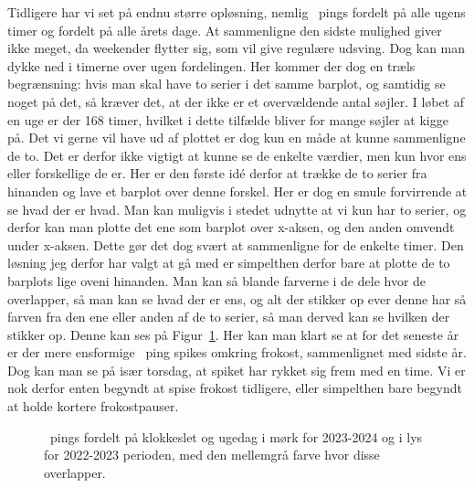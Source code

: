 \documentclass{article}
\newlength\myheight
\newlength\mydepth
\newcommand*\inlinegraphics[1]{%
  \settototalheight\myheight{Xygp}%
  \settodepth\mydepth{Xygp}%
  \raisebox{-\mydepth}{\texttt{[image: \#1]}}%
}
\newcommand{\coffee}[0]{\inlinegraphics{coffee.png}}
\begin{document}
Tidligere har vi set på endnu større opløsning, nemlig \coffee\ pings fordelt på alle ugens timer og fordelt på alle årets dage. At sammenligne den sidste mulighed giver ikke meget, da weekender flytter sig, som vil give regulære udsving. Dog kan man dykke ned i timerne over ugen fordelingen.
Her kommer der dog en træls begrænsning: hvis man skal have to serier i det samme barplot, og samtidig se noget på det, så kræver det, at der ikke er et overvældende antal søjler. I løbet af en uge er der 168 timer, hvilket i dette tilfælde bliver for mange søjler at kigge på.
Det vi gerne vil have ud af plottet er dog kun en måde at kunne sammenligne de to. Det er derfor ikke vigtigt at kunne se de enkelte værdier, men kun hvor ens eller forskellige de er. Her er den første idé derfor at trække de to serier fra hinanden og lave et barplot over denne forskel. Her er dog en smule forvirrende at se hvad der er hvad. Man kan muligvis i stedet udnytte at vi kun har to serier, og derfor kan man plotte det ene som barplot over x-aksen, og den anden omvendt under x-aksen. Dette gør det dog svært at sammenligne for de enkelte timer. Den løsning jeg derfor har valgt at gå med er simpelthen derfor bare at plotte de to barplots lige oveni hinanden. Man kan så blande farverne i de dele hvor de overlapper, så man kan se hvad der er ens, og alt der stikker op ever denne har så farven fra den ene eller anden af de to serier, så man derved kan se hvilken der stikker op. Denne kan ses på Figur~\ref{fig:weekday_analysis_hour_imposed_2022-2023_2023-2024}.
Her kan man klart se at for det seneste år er der mere ensformige \coffee\ ping spikes omkring frokost, sammenlignet med sidste år. Dog kan man se på især torsdag, at spiket har rykket sig frem med en time. Vi er nok derfor enten begyndt at spise frokost tidligere, eller simpelthen bare begyndt at holde kortere frokostpauser.

\begin{figure}[h!]
	\centering
	\resizebox{\textwidth}{!}{}
	\vspace{-25pt}
	\caption{\protect\coffee\ pings fordelt på klokkeslet og ugedag i mørk for 2023-2024 og i lys for 2022-2023 perioden, med den mellemgrå farve hvor disse overlapper.}
	\label{fig:weekday_analysis_hour_imposed_2022-2023_2023-2024}
\end{figure}
\end{document}
